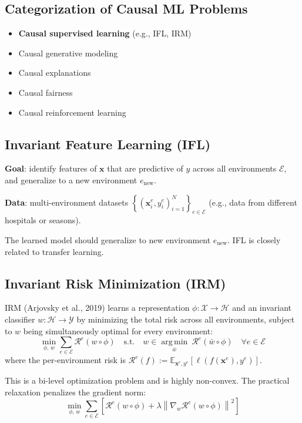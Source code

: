 \documentclass[UTF8]{ctexart}
\begin{document}
\subsection{Categorization of Causal ML Problems}
\begin{itemize}
    \item \textbf{Causal supervised learning} (e.g., IFL, IRM)
    \item Causal generative modeling
    \item Causal explanations
    \item Causal fairness
    \item Causal reinforcement learning
\end{itemize}

\subsection{Invariant Feature Learning (IFL)}

\textbf{Goal}: identify features of $\mathbf{x}$ that are predictive of $y$ across all environments $\mathcal{E}$, and generalize to a new environment $e_{\mathrm{new}}$.

\textbf{Data}: multi-environment datasets $\left\{(\mathbf{x}_i^e, y_i^e)_{i=1}^{N}\right\}_{e \in \mathcal{E}}$ (e.g., data from different hospitals or seasons).

The learned model should generalize to new environment $e_{\mathrm{new}}$. IFL is closely related to transfer learning.

\subsection{Invariant Risk Minimization (IRM)}

IRM (Arjovsky et al., 2019) learns a representation $\phi: \mathcal{X} \to \mathcal{H}$ and an invariant classifier $w: \mathcal{H} \to \mathcal{Y}$ by minimizing the total risk across all environments, subject to $w$ being simultaneously optimal for every environment:
\[
    \min_{\phi,\, w} \sum_{e \in \mathcal{E}} \mathcal{R}^e(w \circ \phi) \quad \text{s.t.} \quad w \in \operatorname*{arg\,min}_{\bar{w}}\ \mathcal{R}^e(\bar{w} \circ \phi) \quad \forall e \in \mathcal{E}
\]
where the per-environment risk is $\mathcal{R}^e(f) := \mathbb{E}_{\mathbf{x}^e, y^e}[\ell(f(\mathbf{x}^e), y^e)]$.

This is a bi-level optimization problem and is highly non-convex. The practical relaxation penalizes the gradient norm:
\[
    \min_{\phi,\, w} \sum_{e \in \mathcal{E}} \left[\mathcal{R}^e(w \circ \phi) + \lambda \left\|\nabla_w \mathcal{R}^e(w \circ \phi)\right\|^2\right]
\]
\end{document}

